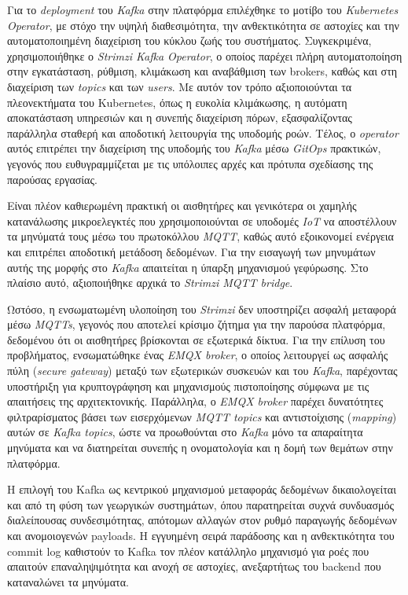 Για το \textit{deployment} του \textit{Kafka} στην πλατφόρμα επιλέχθηκε το
μοτίβο του \textit{Kubernetes Operator}, με στόχο την υψηλή διαθεσιμότητα, την
ανθεκτικότητα σε αστοχίες και την αυτοματοποιημένη διαχείριση του κύκλου ζωής
του συστήματος. Συγκεκριμένα, χρησιμοποιήθηκε ο \textit{Strimzi Kafka
	Operator}, ο οποίος παρέχει πλήρη αυτοματοποίηση στην εγκατάσταση, ρύθμιση,
κλιμάκωση και αναβάθμιση των brokers, καθώς και στη διαχείριση των
\textit{topics} και των \textit{users}. Με αυτόν τον τρόπο αξιοποιούνται τα
πλεονεκτήματα του Kubernetes, όπως η ευκολία κλιμάκωσης, η αυτόματη
αποκατάσταση υπηρεσιών και η συνεπής διαχείριση πόρων, εξασφαλίζοντας παράλληλα
σταθερή και αποδοτική λειτουργία της υποδομής ροών. Τέλος, ο \textit{operator}
αυτός επιτρέπει την διαχείριση της υποδομής του \textit{Kafka} μέσω
\textit{GitOps} πρακτικών, γεγονός που ευθυγραμμίζεται με τις υπόλοιπες αρχές
και πρότυπα σχεδίασης της παρούσας εργασίας.

Είναι πλέον καθιερωμένη πρακτική οι αισθητήρες και γενικότερα οι χαμηλής
κατανάλωσης μικροελεγκτές που χρησιμοποιούνται σε υποδομές \textit{IoT} να
αποστέλλουν τα μηνύματά τους μέσω του πρωτοκόλλου \textit{MQTT}, καθώς αυτό
εξοικονομεί ενέργεια και επιτρέπει αποδοτική μετάδοση δεδομένων. Για την
εισαγωγή των μηνυμάτων αυτής της μορφής στο \textit{Kafka} απαιτείται η ύπαρξη
μηχανισμού γεφύρωσης. Στο πλαίσιο αυτό, αξιοποιήθηκε αρχικά το \textit{Strimzi
	MQTT bridge}.

Ωστόσο, η ενσωματωμένη υλοποίηση του \textit{Strimzi} δεν υποστηρίζει ασφαλή
μεταφορά μέσω \textit{MQTTs}, γεγονός που αποτελεί κρίσιμο ζήτημα για την
παρούσα πλατφόρμα, δεδομένου ότι οι αισθητήρες βρίσκονται σε εξωτερικά δίκτυα.
Για την επίλυση του προβλήματος, ενσωματώθηκε ένας \textit{EMQX broker}, ο
οποίος λειτουργεί ως ασφαλής πύλη (\textit{secure gateway}) μεταξύ των
εξωτερικών συσκευών και του \textit{Kafka}, παρέχοντας υποστήριξη για
κρυπτογράφηση και μηχανισμούς πιστοποίησης σύμφωνα με τις απαιτήσεις της
αρχιτεκτονικής. Παράλληλα, ο \textit{EMQX broker} παρέχει δυνατότητες
φιλτραρίσματος βάσει των εισερχόμενων \textit{MQTT topics} και αντιστοίχισης
(\textit{mapping}) αυτών σε \textit{Kafka topics}, ώστε να προωθούνται στο
\textit{Kafka} μόνο τα απαραίτητα μηνύματα και να διατηρείται συνεπής η
ονοματολογία και η δομή των θεμάτων στην πλατφόρμα.

Η επιλογή του Kafka ως κεντρικού μηχανισμού μεταφοράς δεδομένων δικαιολογείται
και από τη φύση των γεωργικών συστημάτων, όπου παρατηρείται συχνά συνδυασμός
διαλείπουσας συνδεσιμότητας, απότομων αλλαγών στον ρυθμό παραγωγής δεδομένων
και ανομοιογενών payloads. Η εγγυημένη σειρά παράδοσης και η ανθεκτικότητα του
commit log καθιστούν το Kafka τον πλέον κατάλληλο μηχανισμό για ροές που
απαιτούν επαναληψιμότητα και ανοχή σε αστοχίες, ανεξαρτήτως του backend που
καταναλώνει τα μηνύματα.

